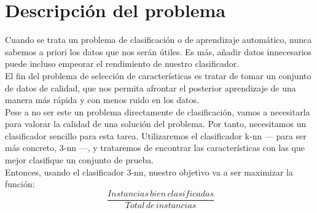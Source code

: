 \begin{titlepage}

 

\vfill %

\end{titlepage}
\tableofcontents
\newpage
\section{Descripción del problema}
Cuando se trata un problema de clasificación o de aprendizaje automático, nunca sabemos a priori los datos que nos serán útiles. Es más, añadir datos innecesarios puede incluso empeorar el rendimiento de nuestro clasificador.\\
 
 El fin del problema de selección de características es tratar de tomar un conjunto de datos de calidad, que nos permita afrontar el posterior aprendizaje de una manera más rápida y con menos ruido en los datos.\\
 
Pese a no ser este un problema directamente de clasificación, vamos a necesitarla para valorar la calidad de una solución del problema. Por tanto, necesitamos un clasificador sencillo para esta tarea. Utilizaremos el clasificador k-nn --- para ser más concreto, 3-nn ---, y trataremos de encontrar las características con las que mejor clasifique un conjunto de prueba.\\

Entonces, usando el clasificador 3-nn, nuestro objetivo va a ser maximizar la función:\\
 
 \[
 \	\frac{Instancias\, bien\, clasificadas}{Total\, de\, instancias}
 \]
 
 
\newpage
